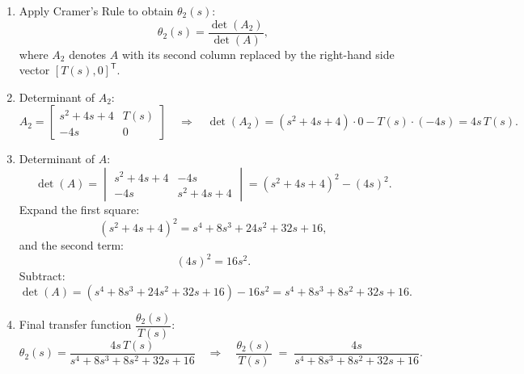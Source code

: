 \documentclass[11pt]{article}
\begin{document}
\begin{enumerate}[label=(\alph*), itemindent=*, leftmargin=*, nolistsep]
    \item Apply Cramer's Rule to obtain \(\theta_2(s)\):
    \[
    \theta_2(s) = \frac{\det(A_2)}{\det(A)},
    \]
    where \(A_2\) denotes \(A\) with its second column replaced by the right-hand side vector \([T(s),0]^\mathsf{T}\).

    \item Determinant of \(A_2\):
    \[
    A_2 = \begin{bmatrix}
    s^2+4s+4 & T(s) \\
    -4s & 0
    \end{bmatrix}
    \quad\Longrightarrow\quad
    \det(A_2) = (s^2+4s+4)\cdot 0 - T(s)\cdot(-4s) = 4s\,T(s).
    \]

    \item Determinant of \(A\):
    \[
    \det(A) = 
    \begin{vmatrix}
    s^2+4s+4 & -4s \\
    -4s & s^2+4s+4
    \end{vmatrix}
    = (s^2+4s+4)^2 - (4s)^2.
    \]
    Expand the first square:
    \[
    (s^2+4s+4)^2 = s^4 + 8s^3 + 24s^2 + 32s + 16,
    \]
    and the second term:
    \[
    (4s)^2 = 16s^2.
    \]
    Subtract:
    \[
    \det(A) = (s^4 + 8s^3 + 24s^2 + 32s + 16) - 16s^2
    = s^4 + 8s^3 + 8s^2 + 32s + 16.
    \]

    \item Final transfer function \(\dfrac{\theta_2(s)}{T(s)}\):
    \[
    \theta_2(s) = \frac{4s\,T(s)}{s^4 + 8s^3 + 8s^2 + 32s + 16}
    \quad\Rightarrow\quad
    \boxed{\displaystyle
    \frac{\theta_2(s)}{T(s)} \;=\; \frac{4s}{s^4 + 8s^3 + 8s^2 + 32s + 16}.
    }
    \]

\end{enumerate}

\end{document}

